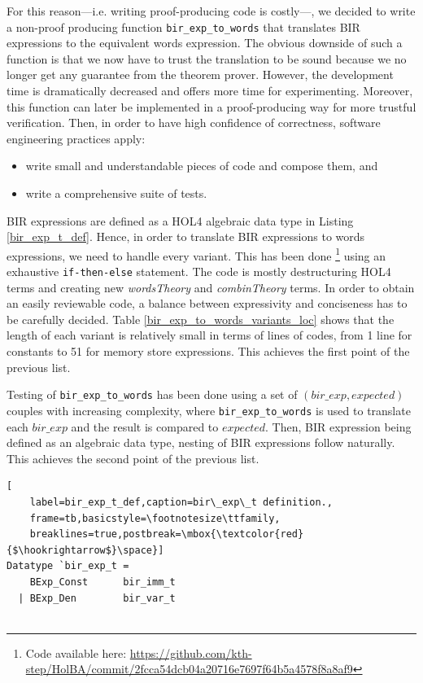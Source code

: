 \documentclass{kththesis}
\begin{document}
{For this reason---i.e. writing \gls{proof-producing} code is costly---, we decided to write a non-proof producing function \texttt{bir\_exp\_to\_words} that translates BIR expressions to the equivalent words expression. The obvious downside of such a function is that we now have to trust the translation to be sound because we no longer get any guarantee from the theorem prover. However, the development time is dramatically decreased and offers more time for experimenting. Moreover, this function can later be implemented in a proof-producing way for more trustful verification. Then, in order to have high confidence of correctness, software engineering practices apply:

\begin{itemize}
    \item write small and understandable pieces of code and compose them, and
    \item write a comprehensive suite of tests.
\end{itemize}

BIR expressions are defined as a HOL4 algebraic data type in Listing \ref{bir_exp_t_def}. Hence, in order to translate BIR expressions to words expressions, we need to handle every variant. This has been done \footnote{Code available here: \url{https://github.com/kth-step/HolBA/commit/2fcca54dcb04a20716e7697f64b5a4578f8a8af9}} using an exhaustive \texttt{if-then-else} statement\footnotemark. The code is mostly destructuring HOL4 terms and creating new \textit{wordsTheory} and \textit{combinTheory} terms. In order to obtain an easily reviewable code, a balance between expressivity and conciseness has to be carefully decided. Table \ref{bir_exp_to_words_variants_loc} shows that the length of each variant is relatively small in terms of lines of codes, from 1 line for constants to 51 for memory store expressions. This achieves the first point of the previous list.


Testing of \texttt{bir\_exp\_to\_words} has been done using a set of $(bir\_exp,expected)$ couples with increasing complexity, where \texttt{bir\_exp\_to\_words} is used to translate each $bir\_exp$ and the result is compared to $expected$. Then, BIR expression being defined as an algebraic data type, nesting of BIR expressions follow naturally. This achieves the second point of the previous list.

\begin{lstlisting}[
    label=bir_exp_t_def,caption=bir\_exp\_t definition.,
    frame=tb,basicstyle=\footnotesize\ttfamily,
    breaklines=true,postbreak=\mbox{\textcolor{red}{$\hookrightarrow$}\space}]
Datatype `bir_exp_t =
    BExp_Const      bir_imm_t
  | BExp_Den        bir_var_t


\end{lstlisting}}
\end{document}

